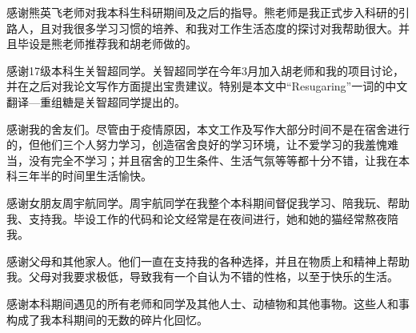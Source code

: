 \documentclass[UTF8,openany,AutoFakeBold,AutoFakeSlant,cs4size]{ctexbook}
\begin{document}
感谢熊英飞老师对我本科生科研期间及之后的指导。熊老师是我正式步入科研的引路人，且对我很多学习习惯的培养、和我对工作生活态度的探讨对我帮助很大。并且毕设是熊老师推荐我和胡老师做的。

感谢17级本科生关智超同学。关智超同学在今年3月加入胡老师和我的项目讨论，并在之后对我论文写作方面提出宝贵建议。特别是本文中“Resugaring”一词的中文翻译---重组糖是关智超同学提出的。

感谢我的舍友们。尽管由于疫情原因，本文工作及写作大部分时间不是在宿舍进行的，但他们三个人努力学习，创造宿舍良好的学习环境，让不爱学习的我羞愧难当，没有完全不学习；并且宿舍的卫生条件、生活气氛等等都十分不错，让我在本科三年半的时间里生活愉快。

感谢女朋友周宇航同学。周宇航同学在我整个本科期间督促我学习、陪我玩、帮助我、支持我。毕设工作的代码和论文经常是在夜间进行，她和她的猫经常熬夜陪我。

感谢父母和其他家人。他们一直在支持我的各种选择，并且在物质上和精神上帮助我。父母对我要求极低，导致我有一个自认为不错的性格，以至于快乐的生活。

感谢本科期间遇见的所有老师和同学及其他人士、动植物和其他事物。这些人和事构成了我本科期间的无数的碎片化回忆。


{
	\fancyhf{}
	\fancyfoot[CO,CE]{~\thepage~}
	\renewcommand{\headrulewidth}{0.7pt}
	\renewcommand{\footrulewidth}{0pt}
}
\fancyhf{}
\fancyfoot[CO,CE]{~\thepage~}
\renewcommand{\headrulewidth}{0.7pt}
\renewcommand{\footrulewidth}{0pt}
\end{document}
